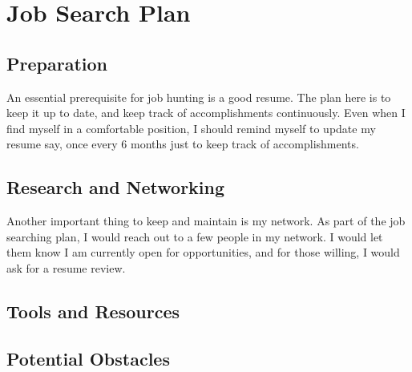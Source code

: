 \section{Job Search Plan}

\subsection{Preparation}
An essential prerequisite for job hunting is a good resume. The plan here is to
keep it up to date, and keep track of accomplishments continuously. Even when I
find myself in a comfortable position, I should remind myself to update my
resume say, once every 6 months just to keep track of accomplishments. 

\subsection{Research and Networking}
Another important thing to keep and maintain is my network. As part of the job searching
plan, I would reach out to a few people in my network. I would let them know I
am currently open for opportunities, and for those willing, I would ask for a
resume review. 

\subsection{Tools and Resources}

\subsection{Potential Obstacles}
